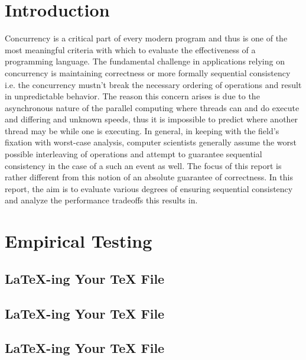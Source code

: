 \section{Introduction}
Concurrency is a critical part of every modern program and thus is one of the most meaningful criteria with which to evaluate the effectiveness of a programming language. The fundamental challenge in applications relying on concurrency is maintaining correctness or more formally sequential consistency i.e. the concurrency mustn't break the necessary ordering of operations and result in unpredictable behavior. 
The reason this concern arises is due to the asynchronous nature of the parallel computing where threads can and do execute and differing and unknown speeds, thus it is impossible to predict where another thread may be while one is executing. 
In general, in keeping with the field's fixation with worst-case analysis, computer scientists generally assume the worst possible interleaving of operations and attempt to guarantee sequential consistency in the case of a such an event as well. The focus of this report is rather different from this notion of an absolute guarantee of correctness. In this report, the aim is to evaluate various degrees of ensuring sequential consistency and analyze the performance tradeoffs this results in. 

\section{Empirical Testing}

\subsection{LaTeX-ing Your TeX File}
\subsection{LaTeX-ing Your TeX File}
\subsection{LaTeX-ing Your TeX File}

